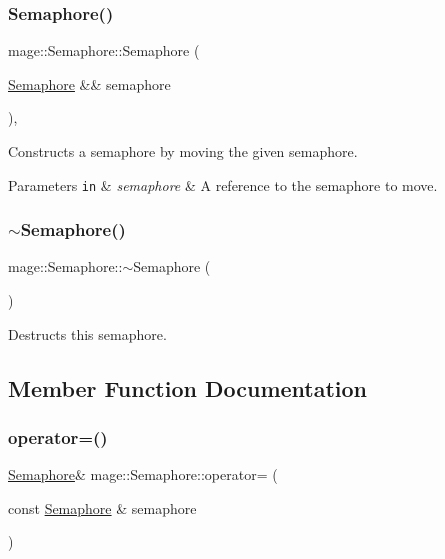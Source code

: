 \subsubsection{\texorpdfstring{Semaphore()}{Semaphore()}\hspace{0.1cm}{\footnotesize\ttfamily [3/3]}}
{\footnotesize\ttfamily mage\+::\+Semaphore\+::\+Semaphore (\begin{DoxyParamCaption}\item[{\hyperlink{structmage_1_1_semaphore}{Semaphore} \&\&}]{semaphore }\end{DoxyParamCaption})\hspace{0.3cm}{\ttfamily [default]}, {\ttfamily [noexcept]}}

Constructs a semaphore by moving the given semaphore.


\begin{DoxyParams}[1]{Parameters}
\mbox{\tt in}  & {\em semaphore} & A reference to the semaphore to move. \\
\hline
\end{DoxyParams}
\hypertarget{structmage_1_1_semaphore_a991ed365c28e4a9c63ff34a5efeb012d}{}\label{structmage_1_1_semaphore_a991ed365c28e4a9c63ff34a5efeb012d} 
\subsubsection{\texorpdfstring{$\sim$\+Semaphore()}{~Semaphore()}}
{\footnotesize\ttfamily mage\+::\+Semaphore\+::$\sim$\+Semaphore (\begin{DoxyParamCaption}{ }\end{DoxyParamCaption})}

Destructs this semaphore. 

\subsection{Member Function Documentation}
\hypertarget{structmage_1_1_semaphore_af3308cf7fa1ed33cda0ee53b9565f658}{}\label{structmage_1_1_semaphore_af3308cf7fa1ed33cda0ee53b9565f658} 
\subsubsection{\texorpdfstring{operator=()}{operator=()}\hspace{0.1cm}{\footnotesize\ttfamily [1/2]}}
{\footnotesize\ttfamily \hyperlink{structmage_1_1_semaphore}{Semaphore}\& mage\+::\+Semaphore\+::operator= (\begin{DoxyParamCaption}\item[{const \hyperlink{structmage_1_1_semaphore}{Semaphore} \&}]{semaphore }\end{DoxyParamCaption})\hspace{0.3cm}{\ttfamily [delete]}}

